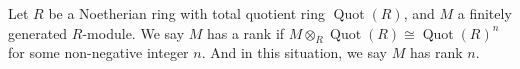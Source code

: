 \documentclass[12pt]{article}
\def\Quot{\operatorname{Quot}}
\begin{document}
Let $R$ be a Noetherian ring with total quotient ring $\Quot(R)$, and $M$ a finitely generated $R$-module. We say $M$ has a rank if $M\otimes_R \Quot(R)\cong \Quot(R)^n$ for some non-negative integer $n$. And in this situation, we say $M$ has rank $n$.
\end{document}
